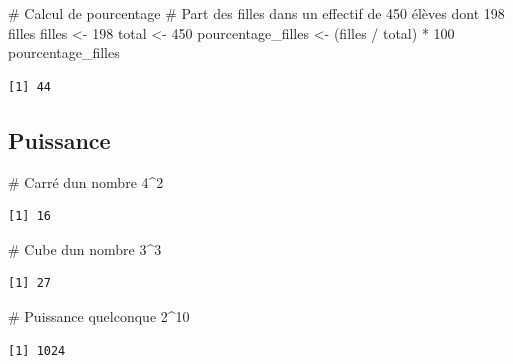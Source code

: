 \documentclass[
  french,
  11pt,
  a4paper,
]{article}
\newenvironment{Shaded}{}{}
\newcommand{\CommentTok}[1]{\textcolor[rgb]{0.42,0.45,0.49}{#1}}
\newcommand{\DecValTok}[1]{\textcolor[rgb]{0.00,0.36,0.77}{#1}}
\newcommand{\NormalTok}[1]{\textcolor[rgb]{0.14,0.16,0.18}{#1}}
\newcommand{\OtherTok}[1]{\textcolor[rgb]{0.44,0.26,0.76}{#1}}
\newcommand{\SpecialCharTok}[1]{\textcolor[rgb]{0.00,0.36,0.77}{#1}}
\begin{document}
\begin{Shaded}
\begin{Highlighting}[]
\CommentTok{\# Calcul de pourcentage}
\CommentTok{\# Part des filles dans un effectif de 450 élèves dont 198 filles}
\NormalTok{filles }\OtherTok{\textless{}{-}} \DecValTok{198}
\NormalTok{total }\OtherTok{\textless{}{-}} \DecValTok{450}
\NormalTok{pourcentage\_filles }\OtherTok{\textless{}{-}}\NormalTok{ (filles }\SpecialCharTok{/}\NormalTok{ total) }\SpecialCharTok{*} \DecValTok{100}
\NormalTok{pourcentage\_filles}
\end{Highlighting}
\end{Shaded}

\begin{verbatim}
[1] 44
\end{verbatim}

\subsection{Puissance}\label{puissance}

\begin{Shaded}
\begin{Highlighting}[]
\CommentTok{\# Carré d\textquotesingle{}un nombre}
\DecValTok{4}\SpecialCharTok{\^{}}\DecValTok{2}
\end{Highlighting}
\end{Shaded}

\begin{verbatim}
[1] 16
\end{verbatim}

\begin{Shaded}
\begin{Highlighting}[]
\CommentTok{\# Cube d\textquotesingle{}un nombre}
\DecValTok{3}\SpecialCharTok{\^{}}\DecValTok{3}
\end{Highlighting}
\end{Shaded}

\begin{verbatim}
[1] 27
\end{verbatim}

\begin{Shaded}
\begin{Highlighting}[]
\CommentTok{\# Puissance quelconque}
\DecValTok{2}\SpecialCharTok{\^{}}\DecValTok{10}
\end{Highlighting}
\end{Shaded}

\begin{verbatim}
[1] 1024
\end{verbatim}
\end{document}
